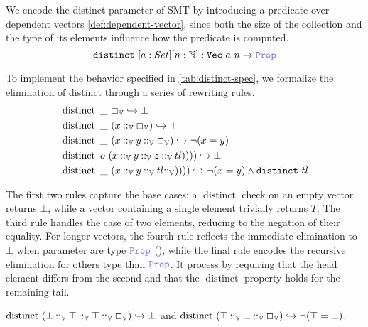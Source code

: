 \begin{definition}
We encode the distinct parameter of SMT by introducing a predicate over dependent vectors \cref{def:dependent-vector},
since both the size of the collection and the type of its elements influence how the predicate is computed.
\begin{equation*}
\kw{distinct}~[a: Set] [n: \N] : \kw{Vec}~a~n \ra \prop
\end{equation*}
\end{definition}

\begin{definition}
To implement the behavior specified in \cref{tab:distinct-spec}, we formalize the elimination of distinct through a series of rewriting rules.
\begin{align*}
&\mathop{\mathrm{distinct}}~ \mathbin{\_}~\Box_\mathbb{V} \hookrightarrow \bot \\
&\mathop{\mathrm{distinct}}~\mathbin{\_}~ (x \mathbin{::}_\mathbb{V} \Box_\mathbb{V}) \hookrightarrow \top \\
&\mathop{\mathrm{distinct}}~\mathbin{\_}~ (x \mathbin{::}_\mathbb{V} y \mathbin{::}_\mathbb{V}  \Box_\mathbb{V}) \hookrightarrow \neg (x = y) \\
&\mathop{\mathrm{distinct}}~o~(x \mathbin{::}_\mathbb{V} y \mathbin{::}_\mathbb{V} z \mathbin{::}_\mathbb{V} tl)))) \hookrightarrow \bot \\
&\mathop{\mathrm{distinct}}~\_~(x \mathbin{::}_\mathbb{V} y \mathbin{::}_\mathbb{V} tl \mathbin{::}_\mathbb{V})))) \hookrightarrow \neg (x = y) \land \texttt{\upshape{distinct}}~tl
\end{align*}

The first two rules capture the base cases: a \(\mathop{\mathrm{distinct}}\) check on an empty vector returns $\bot$, while a vector containing a single element trivially returns $T$.
The third rule handles the case of two elements, reducing to the negation of their equality.
For longer vectors, the fourth rule reflects the immediate elimination to  $\bot$ when parameter are type $\prop$ (),
while the final rule encodes the recursive elimination for others type than $\prop$. It process by requiring that the head element differs from the second and that the
\(\mathop{\mathrm{distinct}}\) property holds for the remaining tail.
\end{definition}

\begin{example}
\(
    \mathop{\mathrm{distinct}}~(\bot \mathbin{::}_\mathbb{V} \top \mathbin{::}_\mathbb{V} \top \mathbin{::}_\mathbb{V} \Box_\mathbb{V}) \hookrightarrow \bot
\)
and
\(
    \mathop{\mathrm{distinct}}~(\top \mathbin{::}_\mathbb{V} \bot \mathbin{::}_\mathbb{V} \Box_\mathbb{V}) \hookrightarrow \neg (\top = \bot).
\)
\end{example}

